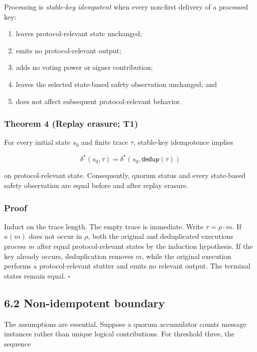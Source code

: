 \documentclass[10pt,a4paper]{article}
\newcommand{\tightlist}{\setlength{\itemsep}{0pt}\setlength{\parskip}{0pt}}
\begin{document}
Processing is \emph{stable-key idempotent} when every non-first delivery
of a processed key:

\begin{enumerate}
\def\labelenumi{\arabic{enumi}.}
\tightlist
\item
  leaves protocol-relevant state unchanged;
\item
  emits no protocol-relevant output;
\item
  adds no voting power or signer contribution;
\item
  leaves the selected state-based safety observation unchanged; and
\item
  does not affect subsequent protocol-relevant behavior.
\end{enumerate}

\subsubsection{Theorem 4 (Replay erasure;
T1)}\label{theorem-4-replay-erasure-t1}

For every initial state \(s_0\) and finite trace \(\tau\), stable-key
idempotence implies

\[
\delta^{*}(s_0,\tau)=
\delta^{*}(s_0,\mathsf{dedup}(\tau))
\]

on protocol-relevant state. Consequently, quorum status and every
state-based safety observation are equal before and after replay
erasure.

\subsubsection{Proof}\label{proof-2}

Induct on the trace length. The empty trace is immediate. Write
\(\tau=\rho\cdot m\). If \(\kappa(m)\) does not occur in \(\rho\), both
the original and deduplicated executions process \(m\) after equal
protocol-relevant states by the induction hypothesis. If the key already
occurs, deduplication removes \(m\), while the original execution
performs a protocol-relevant stutter and emits no relevant output. The
terminal states remain equal. \(\square\)

\subsection{6.2 Non-idempotent boundary}\label{non-idempotent-boundary}

The assumptions are essential. Suppose a quorum accumulator counts
message instances rather than unique logical contributions. For
threshold three, the sequence
\end{document}
